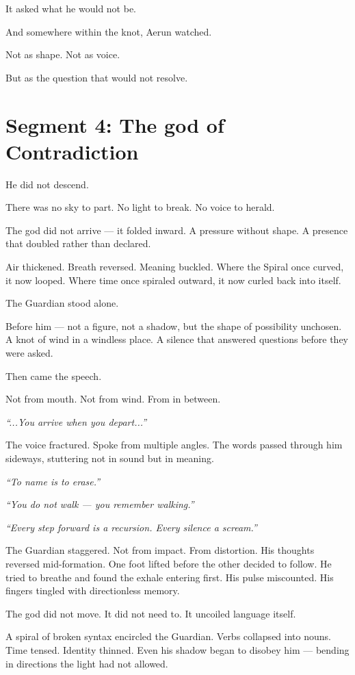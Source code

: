 \documentclass[9pt]{article}
\begin{document}
It asked what he would not be.

And somewhere within the knot, Aerun watched.

Not as shape. Not as voice.

But as the question that would not resolve.

\newpage

\section*{Segment 4: The god of Contradiction}

He did not descend.

There was no sky to part. No light to break. No voice to herald.

The god did not arrive — it folded inward. A pressure without shape. A presence that doubled rather than declared.

Air thickened. Breath reversed. Meaning buckled. Where the Spiral once curved, it now looped. Where time once spiraled outward, it now curled back into itself.

The Guardian stood alone.

Before him — not a figure, not a shadow, but the shape of possibility unchosen. A knot of wind in a windless place. A silence that answered questions before they were asked.

Then came the speech.

Not from mouth. Not from wind. From in between.

\textit{“...You arrive when you depart...”}

The voice fractured. Spoke from multiple angles. The words passed through him sideways, stuttering not in sound but in meaning.

\textit{“To name is to erase.”}

\textit{“You do not walk — you remember walking.”}

\textit{“Every step forward is a recursion. Every silence a scream.”}

The Guardian staggered. Not from impact. From distortion. His thoughts reversed mid-formation. One foot lifted before the other decided to follow. He tried to breathe and found the exhale entering first. His pulse miscounted. His fingers tingled with directionless memory.

The god did not move. It did not need to. It uncoiled language itself.

A spiral of broken syntax encircled the Guardian. Verbs collapsed into nouns. Time tensed. Identity thinned. Even his shadow began to disobey him — bending in directions the light had not allowed.
\end{document}
